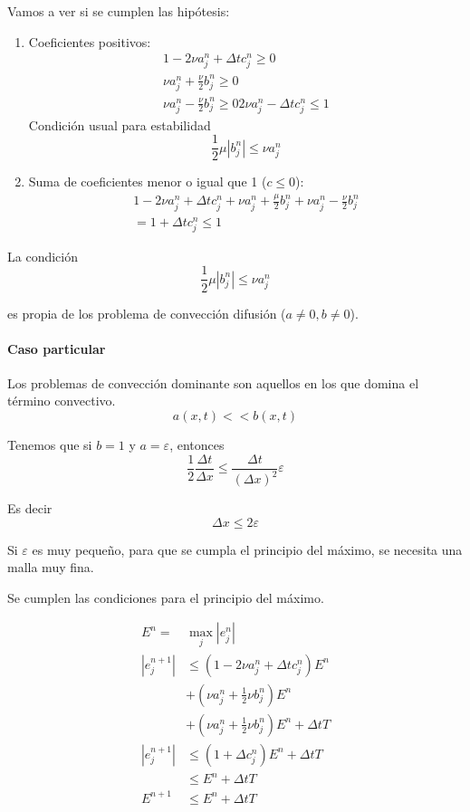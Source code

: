 Vamos a ver si se cumplen las hipótesis:
\begin{enumerate}
	\item Coeficientes positivos:
	\begin{align*}
		1-2\nu a_j^n + \Delta t c_j^n \ge 0\\
		\nu a_j^n + \frac{\nu}{2}b_j^n \ge 0\\
		\nu a_j^n - \frac{\nu}{2}b_j^n \ge 0
		2\nu a_j^n - \Delta t c_j^n \le 1
	\end{align*}
	Condición usual para estabilidad
	$$\frac{1}{2}\mu |b_j^n| \le \nu a_j^n$$
	\item Suma de coeficientes menor o igual que 1 ($c\le 0$):	
	\begin{align*}	
		1-2\nu a_j^n + \Delta t c_j^n + \nu a_j^n + \frac{\mu}{2} b_j^n + \nu a_j^n - \frac{\nu}{2} b_j^n\\
		= 1+\Delta t c_j^n \le 1
	\end{align*}
\end{enumerate}

La condición 
$$\frac{1}{2}\mu |b_j^n| \le \nu a_j^n$$

es propia de los problema de convección difusión ($a\neq 0, b\neq 0$).

\paragraph{Caso particular}
Los problemas de convección dominante son aquellos en los que domina el término convectivo.
$$a(x,t) << b(x,t)$$

Tenemos que si $b = 1$ y $a = \varepsilon$, entonces
$$\frac{1}{2}\frac{\Delta t}{\Delta x} \le \frac{\Delta t}{(\Delta x )^2}\varepsilon$$

Es decir
$$\Delta x \le 2 \varepsilon$$

Si $\varepsilon$ es muy pequeño, para que se cumpla el principio del máximo, se necesita una malla muy fina.

Se cumplen las condiciones para el principio del máximo.

\begin{align*}
	E^n = & \max_j |e_j^n|\\
	|e_j^{n+1}| & \le (1-2\nu a_j^n + \Delta t c_j^n) E^n\\
	& + (\nu a_j^n + \frac{1}{2} \nu b_j^n )E^n\\
	& + (\nu a_j^n + \frac{1}{2}\nu b_j^n)E^n + \Delta t T\\
	|e_j^{n+1}| & \le (1+\Delta c_j^n) E^n + \Delta t T\\
	& \le E^n + \Delta t T\\
	E^{n+1} & \le E^n + \Delta t T\\
\end{align*}

